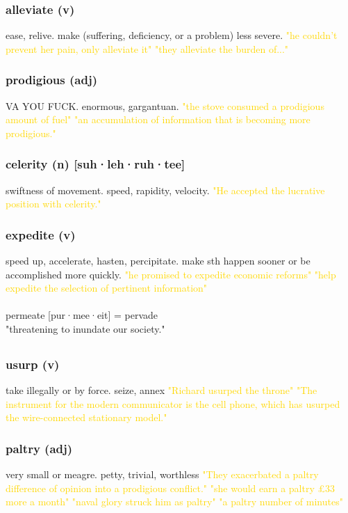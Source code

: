 \documentclass{proc}
\begin{document}
	\subsubsection{\textcolor{brickred}{alleviate} (v)}
	ease, relive. make (suffering, deficiency, or a problem) less severe.
	\textcolor{gold}{"he couldn't prevent her pain, only alleviate it" "they alleviate the burden of..."}
	
	\subsubsection{\textcolor{brickred}{prodigious} (adj)}
	VA YOU FUCK. enormous, gargantuan.
	\textcolor{gold}{"the stove consumed a prodigious amount of fuel" "an accumulation of  information that is becoming more prodigious."}
	
	\subsubsection{\textcolor{brickred}{celerity} (n) [suh·leh·ruh·tee]}
	swiftness of movement. speed, rapidity, velocity.
	\textcolor{gold}{"He accepted the lucrative position with celerity."}
	
	\subsubsection{\textcolor{brickred}{expedite} (v)}
	speed up, accelerate, hasten, percipitate. make sth happen sooner or be accomplished more quickly.
	\textcolor{gold}{"he promised to expedite economic reforms" "help expedite the  selection of  pertinent information"}\\\\
	permeate [pur·mee·eit] = pervade\\
	"threatening to inundate our society."
	
	\newpage
	\subsection{}
	\subsubsection{\textcolor{brickred}{usurp} (v)}
	take illegally or by force. seize, annex
	\textcolor{gold}{"Richard usurped the throne" "The instrument for the modern communicator is the cell phone, which has usurped the wire-connected stationary model."}
	
	\subsubsection{\textcolor{brickred}{paltry} (adj)}
	very small or meagre. petty, trivial, worthless
	\textcolor{gold}{"They exacerbated a paltry difference of opinion into a prodigious conflict." "she would earn a paltry £33 more a month" "naval glory struck him as paltry" "a paltry number of  minutes"}
	
\end{document}
